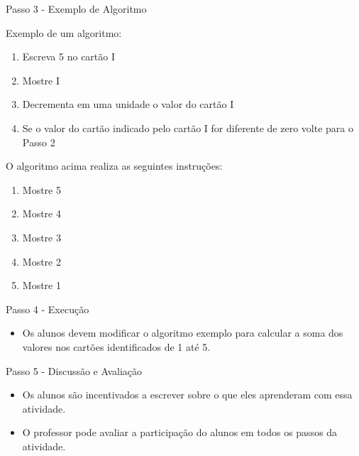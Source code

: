 \documentclass{beamer}
\begin{document}
\begin{frame}{Passo 3 - Exemplo de Algoritmo}

Exemplo de um algoritmo:

\begin{enumerate}
    \item <1->Escreva 5 no cartão I 
    \item <2->Mostre I
    \item <3->Decrementa em uma unidade o valor do cartão I
    \item <4->Se o valor do cartão indicado pelo cartão I for diferente de zero volte para o Passo 2
\end{enumerate}

O algoritmo acima realiza as seguintes instruções:

\begin{enumerate}
    \item <5->Mostre 5
    \item <6->Mostre 4
    \item <7->Mostre 3
    \item <8->Mostre 2
    \item <9->Mostre 1
\end{enumerate}






\end{frame}


\begin{frame}{Passo 4 - Execução}

\begin{itemize}
    \item Os alunos devem modificar o algoritmo exemplo para calcular a soma dos valores nos cartões identificados de 1 até 5.
\end{itemize}




\end{frame}



\begin{frame}{Passo 5 - Discussão e Avaliação}

\begin{itemize}

\item<1-> Os alunos são incentivados a escrever sobre o que eles aprenderam com essa atividade.

\item<2-> O professor pode avaliar a participação do alunos em todos os passos da atividade.

\end{itemize}


\end{frame}
\end{document}
